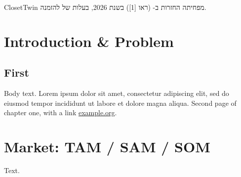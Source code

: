 \documentclass{closettwin}
\begin{document}
\frontmatter
\ctmakecover
\begin{hebrewpage}
ClosetTwin מפחיתה החזרות ב- (ראו [1]) בשנת 2026, בעלות של  להזמנה.
\end{hebrewpage}
\tableofcontents
\mainmatter
\chapter{Introduction \& Problem}
\section{First}
Body text. Lorem ipsum dolor sit amet, consectetur adipiscing elit, sed do eiusmod tempor incididunt ut labore et dolore magna aliqua.
\newpage Second page of chapter one, with a link \href{https://example.org}{example.org}.
\chapter{Market: TAM / SAM / SOM}
Text.
\end{document}

